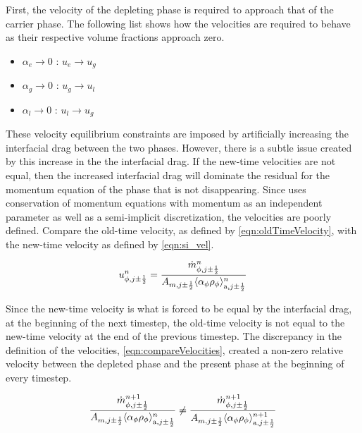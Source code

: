 First, the velocity of the depleting phase is required to approach that of the carrier phase.
The following list shows how the velocities are required to behave as their respective volume fractions approach zero.
\begin{itemize}
\item{ $\alpha_e \rightarrow 0$ : $u_e \rightarrow u_g$}
\item{ $\alpha_g \rightarrow 0$ : $u_g \rightarrow u_l$}
\item{ $\alpha_l \rightarrow 0$ : $u_l \rightarrow u_g$}
\end{itemize}
These velocity equilibrium constraints are imposed by artificially increasing the interfacial drag between the two phases.
However, there is a subtle issue created by this increase in the the interfacial drag.
If the new-time velocities are not equal, then the increased interfacial drag will dominate the residual for the momentum equation of the phase that is not disappearing.
Since \cobra{} uses conservation of momentum equations with momentum as an independent parameter as well as a semi-implicit discretization, the velocities are poorly defined.
Compare the old-time velocity, as defined by \eqref{eqn:oldTimeVelocity}, with the new-time velocity as defined by \eqref{eqn:si_vel}.

\begin{equation}
\label{eqn:oldTimeVelocity}
u^{n}_{\phi, j \pm \onehalf} = \frac{\dot{m}^{n}_{\phi, j \pm \onehalf}}{A_{m, j \pm \onehalf} \ave{\alpha_{\phi} \rho_{\phi}}^{n}_{\text{a}, j \pm \onehalf}} 
\end{equation}

Since the new-time velocity is what is forced to be equal by the interfacial drag, at the beginning of the next timestep, the old-time velocity is not equal to the new-time velocity at the end of the previous timestep.
The discrepancy in the definition of the velocities, \eqref{eqn:compareVelocities}, created a non-zero relative velocity between the depleted phase and the present phase at the beginning of every timestep.

\begin{equation}
\label{eqn:compareVelocities}
\frac{\dot{m}^{n+1}_{\phi, j \pm \onehalf}}{A_{m, j \pm \onehalf} \ave{\alpha_{\phi} \rho_{\phi}}^{n}_{\text{a}, j \pm \onehalf}} \neq \frac{\dot{m}^{n+1}_{\phi, j \pm \onehalf}}{A_{m, j \pm \onehalf} \ave{\alpha_{\phi} \rho_{\phi}}^{n+1}_{\text{a}, j \pm \onehalf}}
\end{equation}

